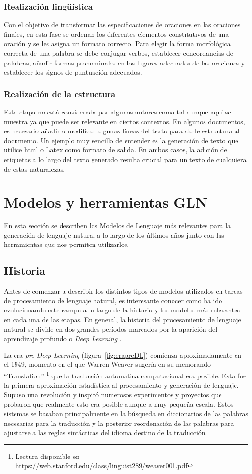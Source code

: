 \subsubsection{Realización lingüística}
Con el objetivo de transformar las especificaciones de oraciones en las oraciones finales, en esta fase se ordenan los diferentes elementos constitutivos de una oración y se les asigna un formato correcto. Para elegir la forma morfológica correcta de una palabra se debe conjugar verbos, establecer concordancias de palabras, añadir formas pronominales en los lugares adecuados de las oraciones y establecer los signos de puntuación adecuados. 

\subsubsection{Realización de la estructura}
Esta etapa no está considerada por algunos autores como tal aunque aquí se muestra ya que puede ser relevante en ciertos contextos. 
En algunos documentos, es necesario añadir o modificar algunas líneas del texto para darle estructura al documento. Un ejemplo muy sencillo de entender es la generación de texto que utilice html o Latex como formato de salida. En ambos casos, la adición de etiquetas a lo largo del texto generado resulta crucial para un texto de cualquiera de estas naturalezas.


\section{Modelos y herramientas GLN}
\label{sec:modelos}
En esta sección se describen los Modelos de Lenguaje más relevantes para la generación de lenguaje natural a lo largo de los últimos años junto con las herramientas que nos permiten utilizarlos. %

\subsection{Historia}
Antes de comenzar a describir los distintos tipos de modelos utilizados en tareas de procesamiento de lenguaje natural, es interesante conocer como ha ido evolucionando este campo a lo largo de la historia y los modelos más relevantes en cada una de las etapas. En general, la historia del procesamiento de lenguaje natural se divide en dos grandes períodos marcados por la aparición del aprendizaje profundo o \textit{Deep Learning} \citep{louis-2021}. 

La era \textit{pre Deep Learning} (figura~\ref{fig:erapreDL}) comienza aproximadamente en el 1949, momento en el que   Warren Weaver sugería en su memorando ``Translation'' \footnote{ Lectura disponible en https://web.stanford.edu/class/linguist289/weaver001.pdf} que la traducción automática computacional era posible. Esta fue la primera aproximación estadística al procesamiento y generación de lenguaje. Supuso una revolución y inspiró numerosos experimentos y proyectos que probaron que realmente esto era posible aunque a muy pequeña escala. Estos sistemas se basaban principalmente en la búsqueda en diccionarios de las palabras necesarias para la traducción y la posterior reordenación de las palabras para ajustarse a las reglas sintácticas del idioma destino de la traducción.

